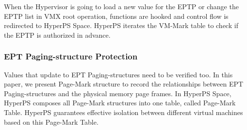 When the Hypervisor is going to load a new value for the EPTP or change the EPTP list in VMX root operation, functions are hooked and control flow is redirected to HyperPS Space. 
HyperPS iterates the VM-Mark table to check if the EPTP is authorized in advance.


\begin{table}[]
    \caption{VM-Mark Structure}
    \label{tb:vmmark}
\end{table}


\subsubsection{EPT Paging-structure Protection}%
\label{ssub:ept_paging_structure_protection}
Values that update to EPT Paging-structures need to be verified too. In this paper, we present Page-Mark structure to record the relationships between EPT Paging-structures and the physical memory page frames. In HyperPS Space, HyperPS composes all Page-Mark structures into one table, called Page-Mark Table.
HyperPS guarantees effective isolation between different virtual machines based on this Page-Mark Table. 

